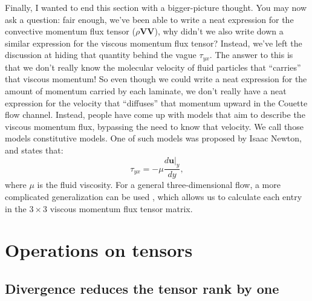 \documentclass[10pt,twocolumn]{article}
\begin{document}
Finally, I wanted to end this section with a bigger-picture thought. You may now ask a question: fair enough, we've been able to write a neat expression for the convective momentum flux tensor ($\rho \pmb{V} \pmb{V}$), why didn't we also write down a similar expression for the viscous momentum flux tensor? Instead, we've left the discussion at hiding that quantity behind the vague $\tau_{yx}$. The answer to this is that we don't really know the molecular velocity of fluid particles that ``carries'' that viscous momentum! So even though we could write a neat expression for the amount of momentum carried by each laminate, we don't really have a neat expression for the velocity that ``diffuses'' that momentum upward in the Couette flow channel. Instead, people have come up with models that aim to describe the viscous momentum flux, bypassing the need to know that velocity. We call those models constitutive models. One of such models was proposed by Isaac Newton, and states that:
\begin{equation*}
\tau_{yx} = - \mu \frac{d \pmb{u}|_y}{dy} ,
\end{equation*}
where $\mu$ is the fluid viscosity.
For a general three-dimensional flow, a more complicated generalization can be used \cite{BSL}, which allows us to calculate each entry in the $3 \times 3$ viscous momentum flux tensor matrix.







\section*{Operations on tensors}

\subsection*{Divergence reduces the tensor rank by one}
\end{document}
